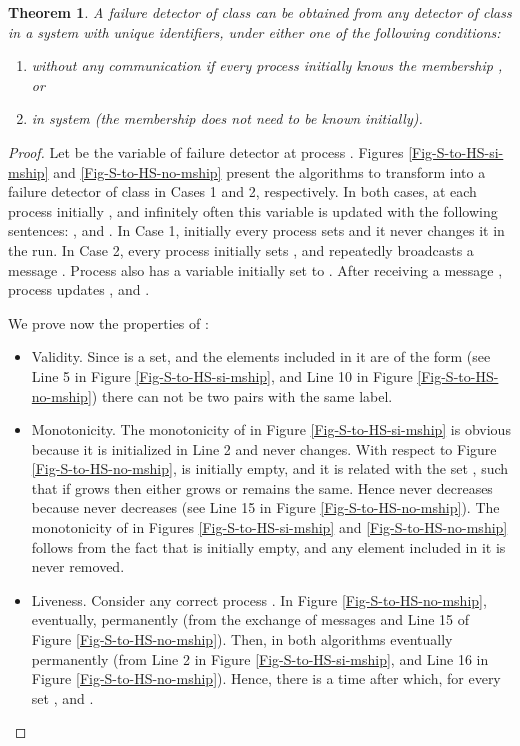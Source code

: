 \documentclass[10pt, conference, compsocconf]{IEEEtran}
\newtheorem{theorem}{Theorem}
\begin{document}
\begin{theorem}
\label{HS-Sigma}
A failure detector of class  can be obtained from any detector  of class  in a system with unique identifiers, under either one of the following conditions:
\begin{enumerate} 
\item without any communication if every process initially knows the membership , or 
\item in system  (the membership does not need to be known initially). 
\end{enumerate} 
\end{theorem}
\begin{proof}
Let  be the variable of  failure detector  at process . 
Figures \ref{Fig-S-to-HS-si-mship} and \ref{Fig-S-to-HS-no-mship} present the algorithms to transform  into a 
failure detector of class  in Cases 1 and 2, respectively.
In both cases, at each process  initially
, and infinitely often this variable is updated with the following sentences: 
, and . In Case 1, initially every process  sets 
 and it never changes it in the run. In Case 2, every process 
initially sets , and repeatedly broadcasts a message . Process  also has a variable  initially set
to . After receiving a message , process  updates 
, and . 

We prove now the properties of :

\begin{itemize}
\item Validity.
Since  is a set, and the elements included in it are of the form  (see Line 5 in Figure \ref{Fig-S-to-HS-si-mship}, and Line 10 in Figure \ref{Fig-S-to-HS-no-mship}) there can not be two pairs with the same label.

\item Monotonicity.
The monotonicity of  in Figure \ref{Fig-S-to-HS-si-mship} is obvious because it is initialized in Line 2 and never changes. With respect to Figure \ref{Fig-S-to-HS-no-mship},  is initially empty, and it is related with the set , such that if  grows then  either grows or remains the same. Hence  never decreases because  never decreases (see Line 15 in Figure \ref{Fig-S-to-HS-no-mship}). 
The monotonicity of  in Figures \ref{Fig-S-to-HS-si-mship} and \ref{Fig-S-to-HS-no-mship} follows from the fact that  is initially empty, and any element  included in it is never removed.

\item Liveness.
Consider any correct process . In Figure \ref{Fig-S-to-HS-no-mship},  eventually,  permanently (from the exchange of  messages and Line 15 of Figure \ref{Fig-S-to-HS-no-mship}). Then, in both algorithms eventually 
 permanently (from Line 2 in Figure \ref{Fig-S-to-HS-si-mship}, and Line 16 in Figure \ref{Fig-S-to-HS-no-mship}). Hence, there is a time  after which, for every set ,  and .


\end{itemize}
\end{proof}
\end{document}

